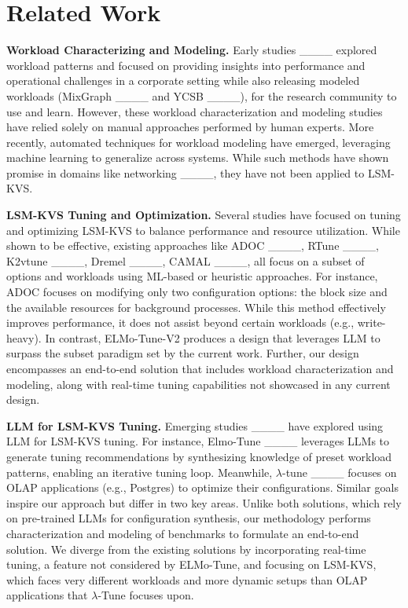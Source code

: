 \section{Related Work}
\vspace{0.3em}
\noindent\textbf{Workload Characterizing and Modeling.}
Early studies ____ explored workload patterns and focused on providing insights into performance and operational challenges in a corporate setting while also releasing modeled workloads (MixGraph ____ and YCSB ____), for the research community to use and learn. However, these workload characterization and modeling studies have relied solely on manual approaches performed by human experts.  
More recently, automated techniques for workload modeling have emerged, leveraging machine learning to generalize across systems. While such methods have shown promise in domains like networking ____, they have not been applied to LSM-KVS. 

\vspace{0.3em}
\noindent\textbf{LSM-KVS Tuning and Optimization.}
Several studies have focused on tuning and optimizing LSM-KVS to balance performance and resource utilization. While shown to be effective, existing approaches like ADOC ____, RTune ____, K2vtune ____, Dremel ____, CAMAL ____, all focus on a subset of options and workloads using ML-based or heuristic approaches. For instance, ADOC focuses on modifying only two configuration options: the block size and the available resources for background processes. While this method effectively improves performance, it does not assist beyond certain workloads (e.g., write-heavy). In contrast, ELMo-Tune-V2 produces a design that leverages LLM to surpass the subset paradigm set by the current work. Further, our design encompasses an end-to-end solution that includes workload characterization and modeling, along with real-time tuning capabilities not showcased in any current design. 

\vspace{0.3em}
\noindent\textbf{LLM for LSM-KVS Tuning.}
Emerging studies ____ have explored using LLM for LSM-KVS tuning. For instance, Elmo-Tune ____ leverages LLMs to generate tuning recommendations by synthesizing knowledge of preset workload patterns, enabling an iterative tuning loop. Meanwhile, $\lambda$-tune ____ focuses on OLAP applications (e.g., Postgres) to optimize their configurations. Similar goals inspire our approach but differ in two key areas. Unlike both solutions, which rely on pre-trained LLMs for configuration synthesis, our methodology performs characterization and modeling of benchmarks to formulate an end-to-end solution. We diverge from the existing solutions by incorporating real-time tuning, a feature not considered by ELMo-Tune, and focusing on LSM-KVS, which faces very different workloads and more dynamic setups than OLAP applications that $\lambda$-Tune focuses upon.